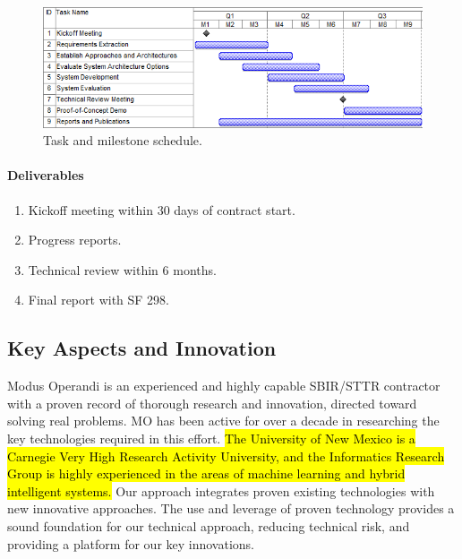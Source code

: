 \documentclass{sbir}
\begin{document}
\begin{figure}[h]
 \centerline{\includegraphics[width=5in]{./images/Gantt.png}}
 \caption{Task and milestone schedule.}
 \label{Gantt}
\end{figure}

\paragraph{Deliverables}
\begin{enumerate}[label=\alph*.] 
\vspace{-0.1in}
\item Kickoff meeting within 30 days of contract start.
\item Progress reports.
\item Technical review within 6 months.
\item Final report with SF 298.
\end{enumerate}


\newpage
{}

\subsection{Key Aspects and Innovation}
Modus Operandi is an experienced and highly capable SBIR/STTR contractor with a proven record of thorough research and innovation, directed toward solving real problems. MO has been active for over a decade in researching the key technologies required in this effort. \hl{The University of New Mexico is a Carnegie Very High Research Activity University, and the Informatics Research Group is highly experienced in the areas of machine learning and hybrid intelligent systems.} Our approach integrates proven existing technologies with new innovative approaches. The use and leverage of proven technology provides a sound foundation for our technical approach, reducing technical risk, and providing a platform for our key innovations.
\end{document}

